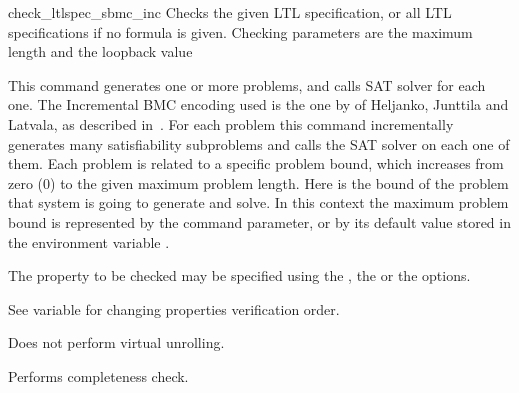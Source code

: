 \begin{nusmvCommand} {check\_ltlspec\_sbmc\_inc} {\label{checkLtlspecSBmcInc}
Checks the given LTL specification, or all LTL specifications if no
formula is given.  Checking parameters are the maximum length and the
loopback value}


This command generates one or more problems, and calls SAT solver for
each one. The Incremental BMC encoding used is the one by of Heljanko,
Junttila and Latvala, as described in~\cite{cav05}.
%
For each problem this command incrementally generates many
satisfiability subproblems and calls the SAT solver on each one of
them.
%
Each problem is related to a specific problem bound, which
increases from zero ($0$) to the given maximum problem length. Here
 is the bound of the problem that system is going to
generate and solve.  In this context the maximum problem bound is
represented by the  command parameter, or by its default
value stored in the environment variable . 

The property to be checked may be specified using the , the  or the  options.

See variable  for changing properties
verification order.

\begin{cmdOpt}

       
            
            

 {Does not perform virtual unrolling.}

 {Performs completeness check.}

\end{cmdOpt}
\end{nusmvCommand}
